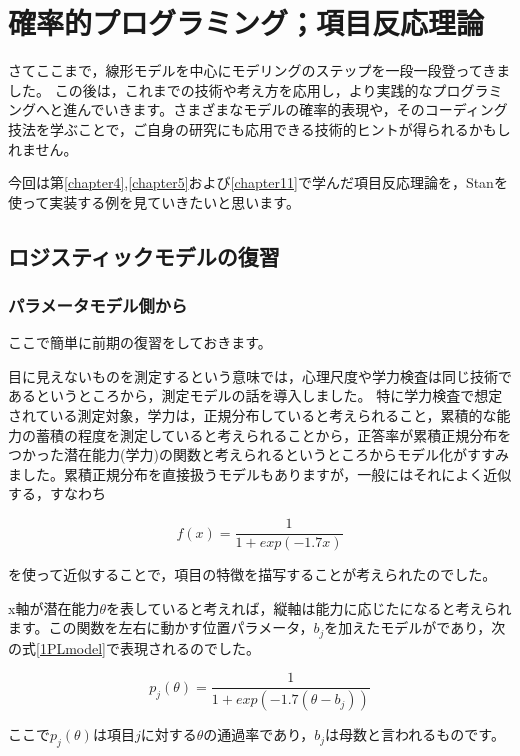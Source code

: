 \documentclass{ltjsbook}
\begin{document}
 
\chapter{確率的プログラミング；項目反応理論}
\label{chapter27} 
さてここまで，線形モデルを中心にモデリングのステップを一段一段登ってきました。
この後は，これまでの技術や考え方を応用し，より実践的なプログラミングへと進んでいきます。さまざまなモデルの確率的表現や，そのコーディング技法を学ぶことで，ご自身の研究にも応用できる技術的ヒントが得られるかもしれません。

今回は第\ref{chapter4},\ref{chapter5}および\ref{chapter11}で学んだ項目反応理論を，Stanを使って実装する例を見ていきたいと思います。
\section{ロジスティックモデルの復習}
\subsection{パラメータモデル側から}
ここで簡単に前期の復習をしておきます。

目に見えないものを測定するという意味では，心理尺度や学力検査は同じ技術であるというところから，測定モデルの話を導入しました。
特に学力検査で想定されている測定対象，学力は，正規分布していると考えられること，累積的な能力の蓄積の程度を測定していると考えられることから，正答率が累積正規分布をつかった潜在能力(学力)の関数と考えられるというところからモデル化がすすみました。累積正規分布を直接扱うモデルもありますが，一般にはそれによく近似する，すなわち

\[ f(x) = \frac{1}{1+exp(-1.7x)}\]

を使って近似することで，項目の特徴を描写することが考えられたのでした。

x軸が潜在能力$\theta$を表していると考えれば，縦軸は能力に応じたになると考えられます。この関数を左右に動かす位置パラメータ，$b_j$を加えたモデルがであり，次の式\ref{1PLmodel}で表現されるのでした。

\begin{equation}     p_j(\theta) = \frac{1}{1+exp(-1.7(\theta-b_j))} \label{1PLmodel} \end{equation}

ここで$p_j(\theta)$は項目$j$に対する$\theta$の通過率であり，$b_j$は母数と言われるものです。
\end{document}
